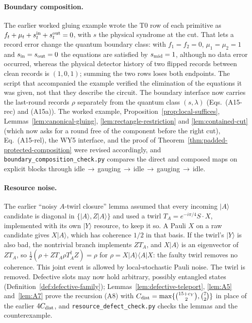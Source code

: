 \documentclass[aps,prx,reprint,superscriptaddress,nofootinbib,floatfix,longbibliography]{revtex4-2}
\theoremstyle{definition}
\begin{document}
\paragraph{Boundary composition.}
The earlier worked gluing example wrote the T0 row of each primitive as
$f_t+\mu_t+s^{\rm in}_t+s^{\rm out}_t=0$, with $s$ the physical syndrome at the
cut.  That lets a record error change the quantum boundary class: with
$f_1=f_2=0$, $\mu_1=\mu_2=1$ and $s_{\rm in}=s_{\rm out}=0$ the equations are
satisfied by $s_{\rm mid}=1$, although no data error occurred, whereas the
physical detector history of two flipped records between clean records is
$(1,0,1)$; summing the two rows loses both endpoints.  The script that
accompanied the example verified the elimination of the equations it was
given, not that they describe the circuit.  The boundary interface now carries
the last-round records $\rho$ separately from the quantum class $(s,\lambda)$
(Eqs.~(A15-rec) and (A15a)).  The worked example, Proposition~\ref{prop:local-suffices},
Lemmas~\ref{lem:canonical-gluing}, \ref{lem:rectangle-restriction} and
\ref{lem:contained-cut} (which now asks for a round free of the component
before the right cut), Eq.~(A15-rel), the WY5 interface, and the proof of
Theorem~\ref{thm:padded-protected-composition} were revised accordingly, and
\texttt{boundary\_composition\_check.py} compares the direct and composed maps
on explicit blocks through idle$\,\to\,$gauging$\,\to\,$idle$\,\to\,$gauging$\,\to\,$idle.

\paragraph{Resource noise.}
The earlier ``noisy $A$-twirl closure'' lemma assumed that every incoming
$|A\rangle$ candidate is diagonal in $\{|A\rangle,Z|A\rangle\}$ and used a twirl
$T_A=e^{-i\pi/4}S\cdot X$, implemented with its own $|Y\rangle$ resource, to
keep it so.  A Pauli $X$ on a raw candidate gives $X|A\rangle$, which has
coherence $1/2$ in that basis.  If the twirl's $|Y\rangle$ is also bad, the
nontrivial branch implements $ZT_A$, and $X|A\rangle$ is an eigenvector of
$ZT_A$, so $\frac12(\rho+ZT_A\rho T_A^\dagger Z)=\rho$ for
$\rho=X|A\rangle\langle A|X$: the faulty twirl removes no coherence.  This joint
event is allowed by local-stochastic Pauli noise.  The twirl is removed.
Defective slots may now hold arbitrary, possibly entangled states
(Definition~\ref{def:defective-family}); Lemmas~\ref{lem:defective-teleport},
\ref{lem:A5} and~\ref{lem:A7} prove the recursion (A8) with
$C_{\rm dist}=\max\{\binom{15+c_Y}{2},\binom72\}$ in place of the earlier
$4C_{\rm dist}$, and \texttt{resource\_defect\_check.py} checks the lemmas and
the counterexample.
\end{document}
